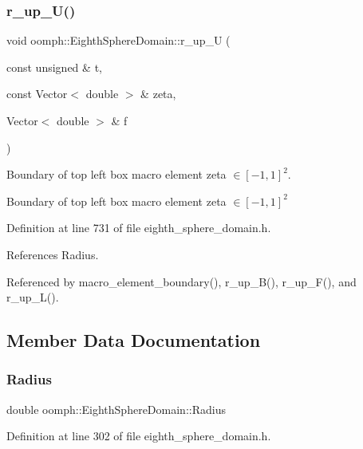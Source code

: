\subsubsection{\texorpdfstring{r\+\_\+up\+\_\+\+U()}{r\_up\_U()}}
{\footnotesize\ttfamily void oomph\+::\+Eighth\+Sphere\+Domain\+::r\+\_\+up\+\_\+U (\begin{DoxyParamCaption}\item[{const unsigned \&}]{t,  }\item[{const Vector$<$ double $>$ \&}]{zeta,  }\item[{Vector$<$ double $>$ \&}]{f }\end{DoxyParamCaption})\hspace{0.3cm}{\ttfamily [private]}}



Boundary of top left box macro element zeta $ \in [-1,1]^2 $. 

Boundary of top left box macro element zeta $ \in [-1,1]^2 $ 

Definition at line 731 of file eighth\+\_\+sphere\+\_\+domain.\+h.



References Radius.



Referenced by macro\+\_\+element\+\_\+boundary(), r\+\_\+up\+\_\+\+B(), r\+\_\+up\+\_\+\+F(), and r\+\_\+up\+\_\+\+L().



\subsection{Member Data Documentation}
\mbox{\label{classoomph_1_1EighthSphereDomain_a9ef9d21c2c9ed0ea28652011b1756419}} 
\subsubsection{\texorpdfstring{Radius}{Radius}}
{\footnotesize\ttfamily double oomph\+::\+Eighth\+Sphere\+Domain\+::\+Radius\hspace{0.3cm}{\ttfamily [private]}}



Definition at line 302 of file eighth\+\_\+sphere\+\_\+domain.\+h.



